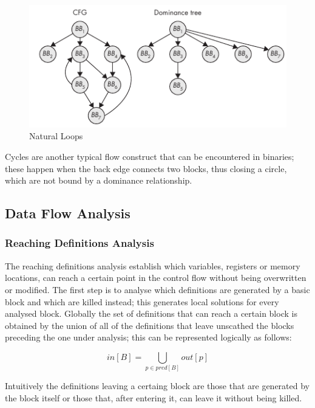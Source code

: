 \begin{figure}
    \begin{center}
        \includegraphics{./pics/natural_loop.png}
        \caption{Natural Loops}
    \end{center}
\end{figure}

Cycles are another typical flow construct that can be encountered in binaries; these happen when the back edge connects
two blocks, thus closing a circle, which are not bound by a dominance relationship.



\subsection{Data Flow Analysis}

\subsubsection{Reaching Definitions Analysis}
The reaching definitions analysis establish which variables, registers or memory locations, can reach a certain point in
the control flow without being overwritten or modified. The first step is to analyse which definitions are generated by
a basic block and which are killed instead; this generates local solutions for every analysed block. Globally the set of
definitions that can reach a certain block is obtained by the union of all of the definitions that leave unscathed the
blocks preceding the one under analysis; this can be represented logically as follows:

\begin{equation}
    in[B] = \bigcup_{p \in pred[B]} out[p]
\end{equation}

Intuitively the definitions leaving a certaing block are those that are generated by the block itself or those that,
after entering it, can leave it without being killed.

